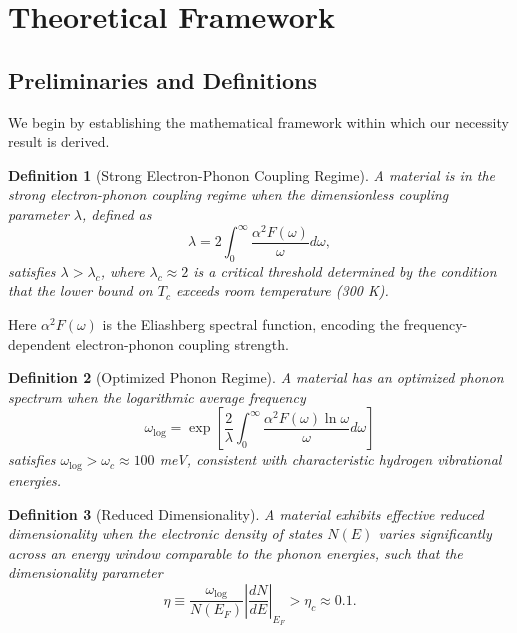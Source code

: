 \documentclass[twocolumn,superscriptaddress]{revtex4-2}
\newtheorem{definition}{Definition}
\begin{document}
\section{Theoretical Framework}

\subsection{Preliminaries and Definitions}

We begin by establishing the mathematical framework within which our necessity result is derived.

\begin{definition}[Strong Electron-Phonon Coupling Regime]
\label{def:strongcoupling}
A material is in the strong electron-phonon coupling regime when the dimensionless coupling parameter $\lambda$, defined as
\begin{equation}
\lambda = 2\int_0^\infty \frac{\alpha^2F(\omega)}{\omega} d\omega,
\end{equation}
satisfies $\lambda > \lambda_c$, where $\lambda_c \approx 2$ is a critical threshold determined by the condition that the lower bound on $T_c$ exceeds room temperature (300 K).
\end{definition}

Here $\alpha^2F(\omega)$ is the Eliashberg spectral function, encoding the frequency-dependent electron-phonon coupling strength.

\begin{definition}[Optimized Phonon Regime]
\label{def:optphonon}
A material has an optimized phonon spectrum when the logarithmic average frequency
\begin{equation}
\omega_{\text{log}} = \exp\left[\frac{2}{\lambda}\int_0^\infty \frac{\alpha^2F(\omega)\ln\omega}{\omega}d\omega\right]
\end{equation}
satisfies $\omega_{\text{log}} > \omega_c \approx 100$ meV, consistent with characteristic hydrogen vibrational energies.
\end{definition}

\begin{definition}[Reduced Dimensionality]
\label{def:lowdim}
A material exhibits effective reduced dimensionality when the electronic density of states $N(E)$ varies significantly across an energy window comparable to the phonon energies, such that the dimensionality parameter
\begin{equation}
\eta \equiv \frac{\omega_{\text{log}}}{N(E_F)}\left|\frac{dN}{dE}\right|_{E_F} > \eta_c \approx 0.1.
\end{equation}
\end{definition}
\end{document}
